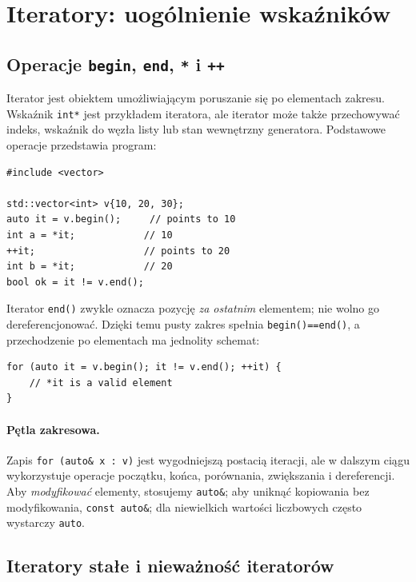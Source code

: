 \section{Iteratory: uogólnienie wskaźników}
\label{sec:cpp8-iterators}

\subsection{Operacje \texttt{begin}, \texttt{end}, \texttt{*} i \texttt{++}}

Iterator jest obiektem umożliwiającym poruszanie się po elementach
zakresu. Wskaźnik \texttt{int*} jest przykładem iteratora, ale iterator
może także przechowywać indeks, wskaźnik do węzła listy lub stan
wewnętrzny generatora. Podstawowe operacje przedstawia program:

\begin{lstlisting}
#include <vector>

std::vector<int> v{10, 20, 30};
auto it = v.begin();     // points to 10
int a = *it;            // 10
++it;                   // points to 20
int b = *it;            // 20
bool ok = it != v.end();
\end{lstlisting}

Iterator \texttt{end()} zwykle oznacza pozycję \emph{za ostatnim}
elementem; nie wolno go dereferencjonować. Dzięki temu pusty zakres
spełnia \texttt{begin()==end()}, a przechodzenie po elementach ma
jednolity schemat:

\begin{lstlisting}
for (auto it = v.begin(); it != v.end(); ++it) {
    // *it is a valid element
}
\end{lstlisting}

\paragraph{Pętla zakresowa.}
Zapis \texttt{for (auto\& x : v)} jest wygodniejszą postacią iteracji,
ale w dalszym ciągu wykorzystuje operacje początku, końca,
porównania, zwiększania i dereferencji. Aby \emph{modyfikować} elementy,
stosujemy \texttt{auto\&}; aby uniknąć kopiowania bez modyfikowania,
\texttt{const auto\&}; dla niewielkich wartości liczbowych często
wystarczy \texttt{auto}.

\subsection{Iteratory stałe i nieważność iteratorów}

